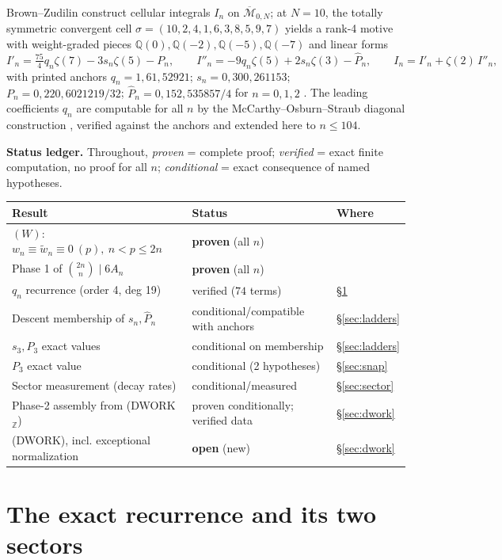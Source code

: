 \documentclass[11pt]{article}
\theoremstyle{definition}\newtheorem{remark}[theorem]{Remark}
\newcommand{\Z}{\mathbb{Z}}\newcommand{\Q}{\mathbb{Q}}\newcommand{\Fp}{\mathbb{F}_p}
\newcommand{\wt}{\widetilde}\newcommand{\dn}{d_n}
\newcommand{\zt}[1]{\zeta(#1)}
\begin{document}
Brown--Zudilin \cite{BZ} construct cellular integrals $I_n$ on
$\overline{\mathcal M}_{0,N}$; at $N=10$, the totally symmetric convergent cell
$\sigma=(10,2,4,1,6,3,8,5,9,7)$ yields a rank-4 motive with weight-graded
pieces $\Q(0),\Q(-2),\Q(-5),\Q(-7)$ and linear forms
\[
I'_n=\tfrac{75}{4}q_n\zt7-3s_n\zt5-P_n,\qquad
I''_n=-9q_n\zt5+2s_n\zt3-\hat P_n,\qquad
I_n=I'_n+\zt2\,I''_n,
\]
with printed anchors $q_n=1,61,52921$; $s_n=0,300,261153$; $P_n=0,220,6021219/32$;
$\hat P_n=0,152,535857/4$ for $n=0,1,2$ \cite{BZ}. The leading coefficients
$q_n$ are computable for all $n$ by the McCarthy--Osburn--Straub diagonal
construction \cite{MOS}, verified against the anchors and extended here to
$n\le104$.

\smallskip\noindent\textbf{Status ledger.} Throughout, \emph{proven} = complete
proof; \emph{verified} = exact finite computation, no proof for all $n$;
\emph{conditional} = exact consequence of named hypotheses.

\begin{center}\small
\begin{tabular}{lll}
\toprule
Result & Status & Where \\
\midrule
$(W)$: $w_n\equiv\wt w_n\equiv0\ (p),\ n<p\le2n$ & \textbf{proven} (all $n$) & \cite{CBcert} \\
Phase 1 of $\binom{2n}{n}\mid6A_n$ & \textbf{proven} (all $n$) & \cite{CBcert} \\
$q_n$ recurrence (order 4, deg 19) & verified ($74$ terms) & \S\ref{sec:rec} \\
Descent membership of $s_n,\hat P_n$ & conditional/compatible with anchors & \S\ref{sec:ladders} \\
$s_3,\hat P_3$ exact values & conditional on membership & \S\ref{sec:ladders} \\
$P_3$ exact value & conditional (2 hypotheses) & \S\ref{sec:snap} \\
Sector measurement (decay rates) & conditional/measured & \S\ref{sec:sector} \\
Phase-2 assembly from (DWORK$_\Z$) & proven conditionally; verified data & \S\ref{sec:dwork} \\
(DWORK), incl. exceptional normalization & \textbf{open} (new) & \S\ref{sec:dwork} \\
\bottomrule
\end{tabular}
\end{center}

\section{The exact recurrence and its two sectors}\label{sec:rec}
\end{document}
